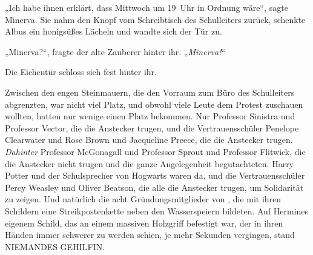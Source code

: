 „Ich habe ihnen erklärt, dass Mittwoch um 19~Uhr in Ordnung wäre“, sagte Minerva. Sie nahm den Knopf vom Schreibtisch des Schulleiters zurück, schenkte Albus ein honigsüßes Lächeln und wandte sich der Tür zu.

„Minerva?“, fragte der alte Zauberer hinter ihr.
„\emph{Minerva!}“

Die Eichentür schloss sich fest hinter ihr.

\later

Zwischen den engen Steinmauern, die den Vorraum zum Büro des Schulleiters abgrenzten, war nicht viel Platz, und obwohl viele Leute dem Protest zuschauen wollten, hatten nur wenige einen Platz bekommen. Nur Professor Sinistra und Professor Vector, die die Anstecker trugen, und die Vertrauensschüler Penelope Clearwater und Rose Brown und Jacqueline Preece, die die Anstecker trugen. \emph{Dahinter} Professor McGonagall und Professor Sprout und Professor Flitwick, die die Anstecker nicht trugen und die ganze Angelegenheit begutachteten. Harry Potter und der Schulsprecher von Hogwarts waren da, und die Vertrauensschüler Percy Weasley und Oliver Beatson, die alle die Anstecker trugen, um Solidarität zu zeigen. Und natürlich die acht Gründungsmitglieder von \SPHEW, die mit ihren Schildern eine Streikpostenkette neben den Wasserspeiern bildeten. Auf Hermines eigenem Schild, das an einem massiven Holzgriff befestigt war, der in ihren Händen immer schwerer zu werden schien, je mehr Sekunden vergingen, stand NIEMANDES GEHILFIN.

